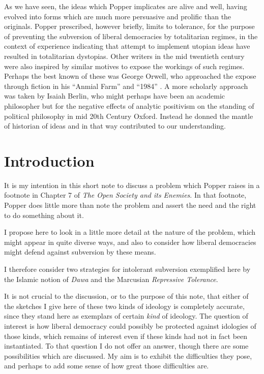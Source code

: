 \documentclass[10pt,titlepage]{book}
\begin{document}
As we have seen, the ideas which Popper implicates are alive and well, having evolved into forms which are much more persuasive and prolific than the originals.
Popper prescribed, however briefly, limits to tolerance, for the purpose of preventing the subversion of liberal democracies by totalitarian regimes, in the context of experience indicating that attempt to implement utopian ideas have resulted in totalitarian dystopias.
Other writers in the mid twentieth century were also inspired by similar motives to expose the workings of such regimes.
Perhaps the best known of these was George Orwell, who approached the expose through fiction in his ``Anmial Farm'' and ``1984'' \cite{orwell-af,orwell-1984,orwell-fd}.
A more scholarly approach was taken by Isaiah Berlin, who might perhaps have been an academic philosopher but for the negative effects of analytic positivism on the standing of political philosophy in mid 20th Century Oxford.
Instead he donned the mantle of historian of ideas and in that way contributed to our understanding.

\section{Introduction}

It is my intention in this short note to discuss a problem which Popper raises in a footnote in Chapter 7 of \emph{The Open Society and its Enemies}\cite{popper-ose}.
In that footnote, Popper does little more than note the problem and assert the need and the right to do something about it.

I propose here to look in a little more detail at the nature of the problem, which might appear in quite diverse ways, and also to consider how liberal democracies might defend against subversion by these means.

I therefore consider two strategies for intolerant subversion exemplified here by the Islamic notion of \emph{Dawa}\cite{ali-dawa,sookhdeo-dawa} and the Marcusian \emph{Repressive Tolerance}\cite{marcuse-repressive}.

It is not crucial to the discussion, or to the purpose of this note, that either of the sketches I give here of these two kinds of ideology is completely accurate, since they stand here as exemplars of certain \emph{kind} of ideology.
The question of interest is how liberal democracy could possibly be protected against idologies of those kinds, which remains of interest even if these kinds had not in fact been instantiated.
To that question I do not offer an answer, though there are some possibilities which are discussed.
My aim is to exhibit the difficulties they pose, and perhaps to add some sense of how great those difficulties are.
\end{document}
